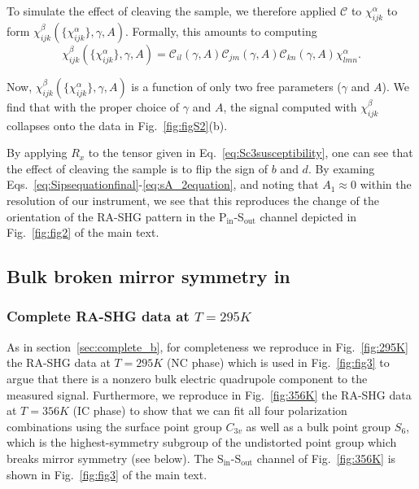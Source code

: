 To simulate the effect of cleaving the sample, we therefore applied $\mathcal{C}$ to $\chi_{ijk}^\alpha$ to form $\chi_{ijk}^\beta(\{\chi_{ijk}^\alpha\}, \gamma, A)$.
Formally, this amounts to computing
\begin{equation}
\label{eq:SapplyingC}
\chi_{ijk}^\beta(\{\chi_{ijk}^\alpha\}, \gamma, A) = \mathcal{C}_{il}(\gamma, A)\mathcal{C}_{jm}(\gamma, A)\mathcal{C}_{kn}(\gamma, A)\chi_{lmn}^\alpha.
\end{equation}

Now, $\chi_{ijk}^\beta(\{\chi_{ijk}^\alpha\}, \gamma, A)$ is a function of only two free parameters ($\gamma$ and $A$).
We find that with the proper choice of $\gamma$ and $A$, the signal computed with $\chi_{ijk}^\beta$ collapses onto the data in Fig.~\ref{fig:figS2}(b).

By applying $R_x$ to the tensor given in Eq.~\ref{eq:Sc3susceptibility}, one can see that the effect of cleaving the sample is to flip the sign of $b$ and $d$.
By examing Eqs.~\ref{eq:Sipsequationfinal}-\ref{eq:sA_2equation}, and noting that $A_1\approx 0$ within the resolution of our instrument, we see that this reproduces the change of the orientation of the RA-SHG pattern in the P$_\mathrm{in}$-S$_\mathrm{out}$ channel depicted in Fig.~\ref{fig:fig2} of the main text.

\subsection{Bulk broken mirror symmetry in \tastwo} \label{sec:Squadrupole}

\subsubsection{Complete RA-SHG data at $T=295K$}

As in section~\ref{sec:complete_b}, for completeness we reproduce in Fig.~\ref{fig:295K} the RA-SHG data at $T=295K$ (NC phase) which is used in Fig.~\ref{fig:fig3} to argue that there is a nonzero bulk electric quadrupole component to the measured signal.
Furthermore, we reproduce in Fig.~\ref{fig:356K} the RA-SHG data at $T=356K$ (IC phase) to show that we can fit all four polarization combinations using the surface point group $C_{3v}$ as well as a bulk point group $S_6$, which is the highest-symmetry subgroup of the undistorted point group which breaks mirror symmetry (see below).
The S$_\mathrm{in}$-S$_\mathrm{out}$ channel of Fig.~\ref{fig:356K} is shown in Fig.~\ref{fig:fig3} of the main text.

